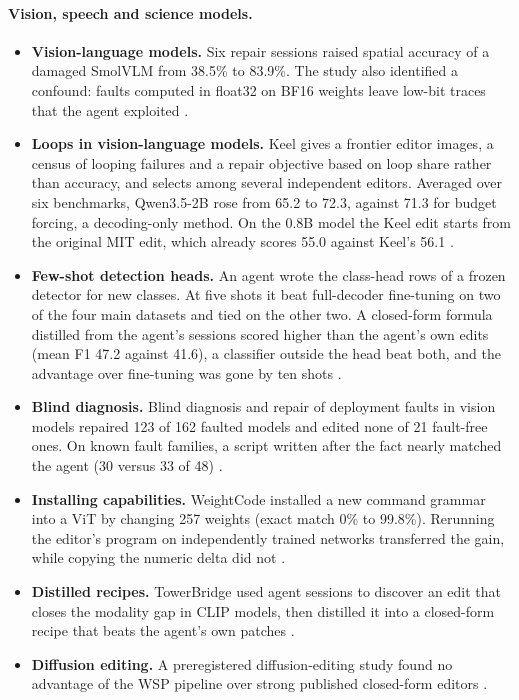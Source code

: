 \paragraph{Vision, speech and science models.}
\begin{itemize}[leftmargin=*,itemsep=2pt]
\item \textbf{Vision-language models.} Six repair sessions raised spatial accuracy of a damaged SmolVLM from 38.5\% to 83.9\%. The study also identified a confound: faults computed in float32 on BF16 weights leave low-bit traces that the agent exploited \citep{ax2611_23615}.
\item \textbf{Loops in vision-language models.} Keel gives a frontier editor images, a census of looping failures and a repair objective based on loop share rather than accuracy, and selects among several independent editors. Averaged over six benchmarks, Qwen3.5-2B rose from 65.2 to 72.3, against 71.3 for budget forcing, a decoding-only method. On the 0.8B model the Keel edit starts from the original MIT edit, which already scores 55.0 against Keel's 56.1 \citep{ax2611_25257}.
\item \textbf{Few-shot detection heads.} An agent wrote the class-head rows of a frozen detector for new classes. At five shots it beat full-decoder fine-tuning on two of the four main datasets and tied on the other two. A closed-form formula distilled from the agent's sessions scored higher than the agent's own edits (mean F1 47.2 against 41.6), a classifier outside the head beat both, and the advantage over fine-tuning was gone by ten shots \citep{ax2611_28105}.
\item \textbf{Blind diagnosis.} Blind diagnosis and repair of deployment faults in vision models repaired 123 of 162 faulted models and edited none of 21 fault-free ones. On known fault families, a script written after the fact nearly matched the agent (30 versus 33 of 48) \citep{ax2611_28781}.
\item \textbf{Installing capabilities.} WeightCode installed a new command grammar into a ViT by changing 257 weights (exact match 0\% to 99.8\%). Rerunning the editor's program on independently trained networks transferred the gain, while copying the numeric delta did not \citep{ax2611_25476}.
\item \textbf{Distilled recipes.} TowerBridge used agent sessions to discover an edit that closes the modality gap in CLIP models, then distilled it into a closed-form recipe that beats the agent's own patches \citep{ax2611_31233}.
\item \textbf{Diffusion editing.} A preregistered diffusion-editing study found no advantage of the WSP pipeline over strong published closed-form editors \citep{ax2611_22228}.

\end{itemize}
